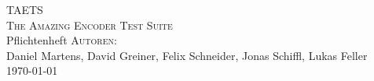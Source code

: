 \documentclass[a4paper]{article}
\begin{document}

\begin{titlepage}
\begin{center}
\vspace*{2.5cm}
{\Huge TAETS}\\[1.5cm]
{\LARGE \textsc{The Amazing Encoder Test Suite}}\\[1.0cm]
{\large Pflichtenheft}
\vfill
\textsc{Autoren:}\\
Daniel Martens, David Greiner, Felix Schneider, Jonas Schiffl, Lukas Feller\\[0.5cm]
\today
\end{center}
\end{titlepage}

\vspace*{\fill}
\vspace*{\fill}
\newpage

\tableofcontents
\newpage
















\end{document}
